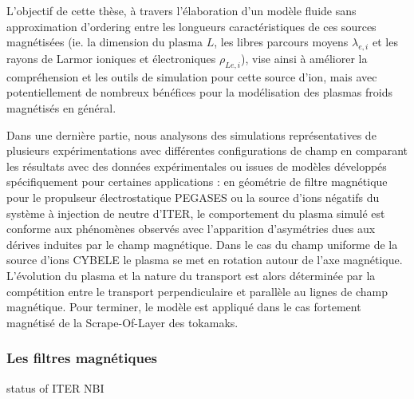 \begin{refsection}
				
L'objectif de cette thèse, à travers l'élaboration d'un modèle fluide sans
approximation d'ordering entre les longueurs caractéristiques de ces sources
magnétisées (ie. la dimension du plasma $L$, les libres parcours moyens
$\lambda_{e,i}$ et les rayons de Larmor ioniques et électroniques
$\rho_{Le,i}$),
vise ainsi à améliorer la compréhension et les outils de simulation pour
cette source d'ion, mais avec potentiellement de nombreux bénéfices pour la
modélisation des plasmas froids magnétisés en général.
		
		Dans une dernière partie, nous analysons des simulations représentatives de
		plusieurs expérimentations avec différentes configurations de champ en comparant
		les résultats avec des données expérimentales ou issues de modèles développés
		spécifiquement pour certaines applications :
		en géométrie de filtre magnétique pour le propulseur électrostatique PEGASES
		ou la source d'ions négatifs du système à injection de neutre d'ITER, le
		comportement du plasma simulé est conforme aux phénomènes observés avec
		l’apparition d’asymétries dues aux dérives induites par le champ magnétique.
		Dans le cas du champ uniforme de la source d'ions CYBELE le plasma se met en
		rotation autour de l'axe magnétique. L'évolution du plasma et la nature du
		transport est alors déterminée par la compétition entre le transport
		perpendiculaire et parallèle au lignes de champ magnétique. Pour terminer, le
		modèle est appliqué dans le cas fortement magnétisé de la Scrape-Of-Layer des
		tokamaks.
		

\subsubsection{Les filtres magnétiques}
\parencite{Hemsworth} status of ITER NBI

\parencite{Rosenbluth}\parencite{Chandrasekhar}
%
%
\end{refsection}

